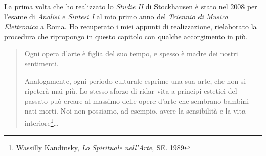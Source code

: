 
	La prima volta che ho realizzato lo \emph{Studie II} di Stockhausen è stato nel 2008 per l'esame di \emph{Analisi e Sintesi I}
	al mio primo anno del \emph{Triennio di Musica Elettronica} a Roma. Ho recuperato i miei appunti di realizzazione, rielaborato la procedura che
	ripropongo in questo capitolo con qualche accorgimento in più.

\begin{quote}
	Ogni opera d'arte \`e figlia del suo tempo, e spesso \`e madre dei nostri
	sentimenti.

	Analogamente, ogni periodo culturale esprime una sua arte, che non si ripeter\`a mai pi\`u.
	Lo stesso sforzo di ridar vita a principi estetici del passato pu\`o creare al massimo delle opere d'arte che sembrano bambini nati morti.
	Noi non possiamo, ad esempio, avere la sensibilit\`a e la vita interiore\footnote{Wassilly Kandinsky, \emph{Lo Spirituale nell'Arte}, SE. 1989}\ldots
\end{quote}

